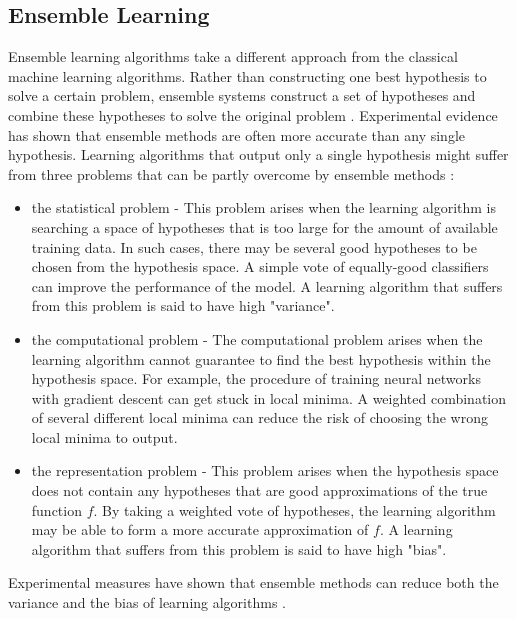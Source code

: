 \documentclass[a4paper,11pt,oneside]{article}
\begin{document}
\subsection{Ensemble Learning}\label{voting}
Ensemble learning algorithms take a different approach from the classical machine learning algorithms.
Rather than constructing one best hypothesis to solve a certain problem, ensemble systems construct 
a set of hypotheses and combine these hypotheses to solve the original problem \cite{dietterich2002ensemble}.
Experimental evidence has shown that ensemble methods are often more accurate than any single hypothesis.
Learning algorithms that output only a single hypothesis might suffer from three problems that can be
partly overcome by ensemble methods \cite{dietterich2002ensemble}:
\begin{itemize}
  \item the statistical problem - This problem arises when the learning algorithm is searching a space 
  of hypotheses that is too large for the amount of available training data. In such cases, there may
  be several good hypotheses to be chosen from the hypothesis space. A simple vote of equally-good 
  classifiers can improve the performance of the model. A learning algorithm that suffers from this problem
  is said to have high "variance".
  \item the computational problem - The computational problem arises when the learning algorithm
  cannot guarantee to find the best hypothesis within the hypothesis space. For example, the procedure
  of training neural networks with gradient descent can get stuck in local minima. A weighted 
  combination of several different local minima can reduce the risk of choosing the wrong local minima 
  to output.
  \item the representation problem - This problem arises when the hypothesis space does not contain 
  any hypotheses that are good approximations of the true function $f$. By taking a weighted vote 
  of hypotheses, the learning algorithm may be able to form a more accurate approximation of $f$.
  A learning algorithm that suffers from this problem is said to have high "bias".
\end{itemize} 
Experimental measures have shown that ensemble methods can reduce both the variance and the bias
of learning algorithms \cite{dietterich2002ensemble}.
\end{document}
